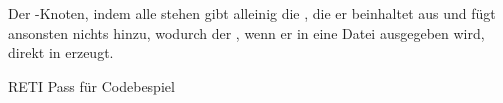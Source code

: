 Der -Knoten, indem alle  stehen gibt alleinig die , die er beinhaltet aus und fügt ansonsten nichts hinzu, wodurch der , wenn er in eine Datei ausgegeben wird, direkt  in  erzeugt.

\begin{code}
  \centering
  \caption{RETI Pass für Codebespiel}
  \label{code:reti_pass_für_codebeispiel}
\end{code}

